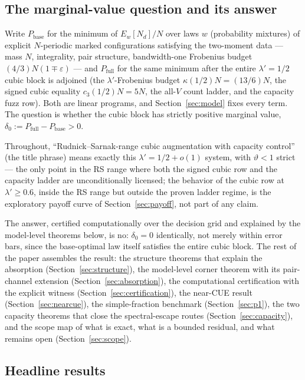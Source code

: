 \documentclass[11pt]{article}
\theoremstyle{plain}
\theoremstyle{definition}
\theoremstyle{remark}
\newcommand{\Nd}{N_{d}}
\begin{document}
\subsection{The marginal-value question and its answer}
\label{sec:marginalvalue}

Write $P_{\mathrm{base}}$ for the minimum of $E_w[\Nd]/N$ over laws $w$
(probability mixtures) of explicit $N$-periodic marked configurations satisfying
the two-moment data --- mass $N$, integrality, pair structure, bandwidth-one
Frobenius budget $(4/3) N (1 \mp \varepsilon)$ --- and $P_{\mathrm{full}}$ for
the same minimum after the entire $\lambda' = 1/2$ cubic block is adjoined (the
$\lambda'$-Frobenius budget $\kappa(1/2) N = (13/6) N$, the signed cubic
equality $c_3(1/2) N = 5N$, the all-$V$ count ladder, and the capacity fuzz
row). Both are linear programs, and Section~\ref{sec:model} fixes every term.
The question is whether the cubic block has strictly positive marginal value,
$\delta_0 := P_{\mathrm{full}} - P_{\mathrm{base}} > 0$.

Throughout, ``Rudnick--Sarnak-range cubic augmentation with capacity control''
(the title phrase) means exactly this
$\lambda' = 1/2 + o(1)$ system, with $\vartheta < 1$ strict --- the only point in
the RS range where both the signed cubic row and
the capacity ladder are unconditionally licensed; the behavior of the cubic row
at $\lambda' \ge 0.6$, inside the RS range but outside the proven ladder regime,
is the exploratory payoff curve of Section~\ref{sec:payoff}, not part of any
claim.

The answer, certified computationally over the decision grid and
explained by the model-level theorems below, is no: $\delta_0 = 0$
identically, not
merely within error bars, since the base-optimal law itself satisfies the entire
cubic block. The rest of the paper assembles the result: the structure theorems
that explain the absorption (Section~\ref{sec:structure}), the model-level corner
theorem with its pair-channel extension (Section~\ref{sec:absorption}), the
computational certification with the explicit witness
(Section~\ref{sec:certification}), the near-CUE result
(Section~\ref{sec:nearcue}), the simple-fraction benchmark
(Section~\ref{sec:p1}), the two capacity theorems that close the spectral-escape
routes (Section~\ref{sec:capacity}), and the scope map of what is exact,
what is a bounded residual, and what remains open (Section~\ref{sec:scope}).

\subsection{Headline results}
\label{sec:headline}
\end{document}
